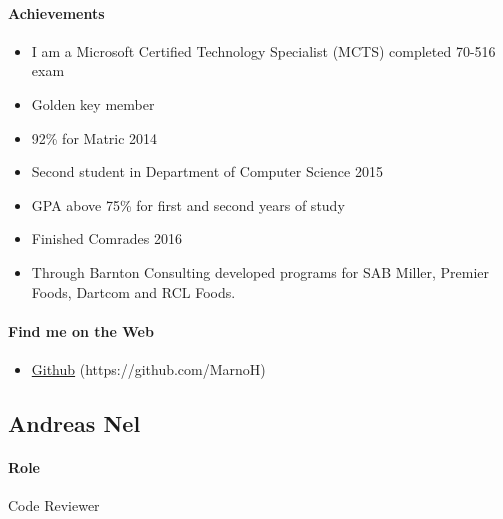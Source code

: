 \documentclass{article}
\begin{document}
        \paragraph{Achievements}
            \begin{itemize}
                \item I am a Microsoft Certified Technology Specialist (MCTS) completed 70-516 exam
                \item Golden key member
                \item 92\% for Matric 2014
                \item Second student in Department of Computer Science 2015
                \item GPA above 75\% for first and second years of study
                \item Finished Comrades 2016
                \item Through Barnton Consulting developed programs for SAB Miller, Premier Foods, Dartcom and RCL Foods.
            \end{itemize}
            
        \paragraph{Find me on the Web}
            \begin{itemize}
                \item \href{https://github.com/MarnoH}{Github} (https://github.com/MarnoH)
            \end{itemize}

\newpage        
    \subsection{Andreas Nel}
        \paragraph{Role} Code Reviewer
\end{document}
